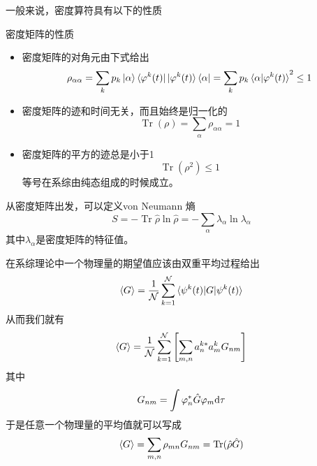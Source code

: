 一般来说，密度算符具有以下的性质
\begin{pointlist}{密度矩阵的性质}
    \begin{itemize}
        \item 密度矩阵的对角元由下式给出\begin{equation}
            \rho_{\alpha\alpha} =\sum_k p_k\ket{\alpha} \bra{\varphi^{k}(t)}\ket{\varphi^k(t)}\bra{\alpha} =\sum_k p_k \braket{\alpha|\varphi^k(t)}^2\le 1
        \end{equation}
        \item 密度矩阵的迹和时间无关，而且始终是归一化的\begin{equation}
            \operatorname{Tr} (\rho) = \sum_{\alpha} \rho_{\alpha\alpha}=1
        \end{equation}
        \item 密度矩阵的平方的迹总是小于1\begin{equation}
            \operatorname{Tr} (\rho^2) \le 1
        \end{equation}
        等号在系综由纯态组成的时候成立。
    \end{itemize}
\end{pointlist}

\begin{definition}
    从密度矩阵出发，可以定义von Neumann 熵 \begin{equation}
        S=-\operatorname{Tr} \hat{\rho} \ln \hat{\rho} =-\sum_{\alpha} \lambda_\alpha \ln \lambda_{\alpha}
    \end{equation}
    其中$\lambda_\alpha$是密度矩阵的特征值。
\end{definition}


在系综理论中一个物理量的期望值应该由双重平均过程给出\begin{equation}
    \braket{G}=\frac{1}{\mathcal{N}}\sum_{k=1}^{\mathcal{N}} \braket{\psi^k(t)|G|\psi^k(t)}
\end{equation}
从而我们就有\begin{equation}
    \braket{G}=\frac{1}{\mathcal{N}} \sum_{k=1}^{\mathcal{N}} \left[\sum_{m,n} a_n^{k*}a_m^k G_{nm}\right]
\end{equation}
其中\begin{equation}
    G_{nm}=\int \varphi_n^* \hat{G} \varphi_m \mathrm{d} \tau
\end{equation}
于是任意一个物理量的平均值就可以写成\begin{equation}
    \braket{G}=\sum_{m,n} \rho_{mn}G_{nm}=\mathrm{Tr} (\hat{\rho}\hat{G}) 
\end{equation} 

